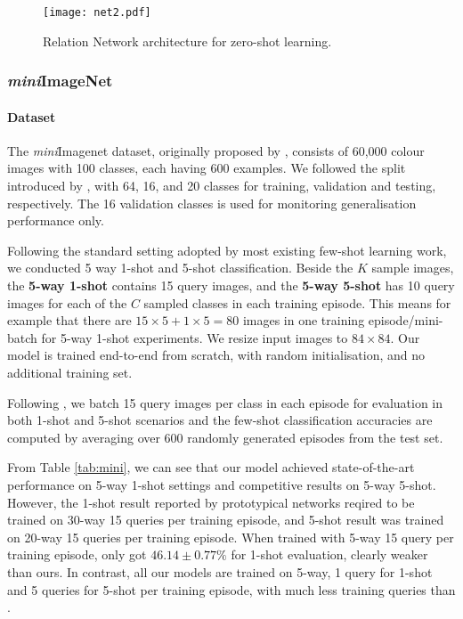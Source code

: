 \documentclass[10pt,twocolumn,letterpaper]{article}
\begin{document}
\begin{figure}[t]
\begin{center}
\texttt{[image: net2.pdf]}
\end{center}
   \caption{\small Relation Network architecture for zero-shot learning.}
\label{fig:networks2}
\vspace{-1em}
\end{figure}


\subsubsection{\textit{mini}ImageNet} 
\paragraph{Dataset}
The \textit{mini}Imagenet dataset, originally proposed by \cite{vinyals2016matching}, consists of 60,000 colour images with 100 classes, each having 600 examples. 
We followed the split introduced by \cite{ravi2016optimization}, with 64, 16, and 20 classes for training, validation and testing, respectively. The 16 validation classes is used for monitoring generalisation performance only.




Following the standard setting adopted by most existing few-shot learning work, we conducted 5 way 1-shot and 5-shot classification. 
Beside the $K$ sample images, the \textbf{5-way 1-shot} contains 15 query images, and the \textbf{5-way 5-shot} has 10 query images for each of the $C$ sampled classes in each training episode.
This means for example that there are $15 \times 5 + 1 \times 5 = 80$ images in one training episode/mini-batch for 5-way 1-shot experiments. We resize  input images to $84 \times 84$. Our model is trained end-to-end from scratch, with random initialisation, and no additional training set. 




Following \cite{snell2017prototypical}, we batch 15 query images per class in each episode for evaluation in both 1-shot and 5-shot scenarios and the few-shot classification accuracies are computed by averaging over 600 randomly generated episodes from the test set.

From Table \ref{tab:mini}, we can see that our model achieved state-of-the-art performance on 5-way 1-shot settings and competitive results on 5-way 5-shot.
However, the 1-shot result reported by prototypical networks \cite{snell2017prototypical} reqired to be trained on 30-way 15 queries per training episode, and 5-shot result was trained on 20-way 15 queries per training episode.
When trained with 5-way 15 query per training episode, \cite{snell2017prototypical} only got $46.14 \pm 0.77\%$ for 1-shot evaluation,
clearly weaker than ours.
In contrast, all our models are trained on 5-way, 1 query for 1-shot and 5 queries for 5-shot per training episode, with much less training queries than \cite{snell2017prototypical}. 
\end{document}
